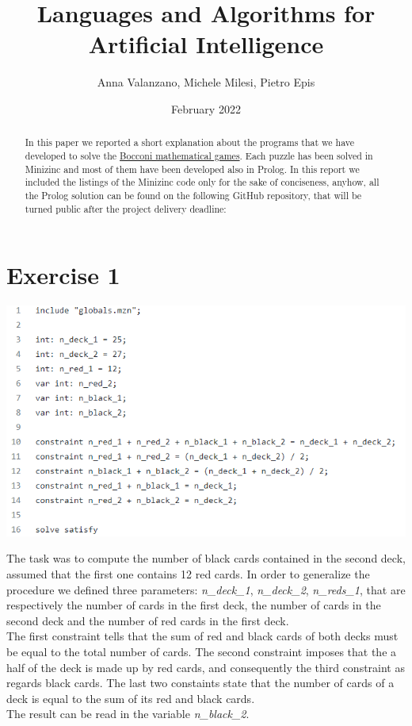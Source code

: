 \documentclass{article}
\title{Languages and Algorithms for Artificial Intelligence}
\date{February 2022}
\author{Anna Valanzano, Michele Milesi, Pietro Epis}
\begin{document}
\maketitle

\begin{abstract}
In this paper we reported a short explanation about the programs that we have developed to solve the \href{https://giochimatematici.unibocconi.it/index.php/gare/giochi-d-autunno/170-gli-allenamenti-ai-giochi-d-autunno}{Bocconi mathematical games}. 
Each puzzle has been solved in Minizinc and most of them have been developed also in Prolog.
In this report we included the listings of the Minizinc code only for the sake of conciseness, anyhow,
all the Prolog solution can be found on the following GitHub repository, that will be turned public after
the project delivery deadline: 

\end{abstract}

\section{Exercise 1}
\vspace{0.2cm}
\includegraphics[width=\linewidth]{img/Es1.png}
\vspace{0.2cm}

The task was to compute the number of black cards contained in the second deck, assumed that
the first one contains 12 red cards. In order to generalize the procedure we defined three parameters:
\textit{n\_deck\_1}, \textit{n\_deck\_2}, \textit{n\_reds\_1}, that are respectively the number of cards in
the first deck, the number of cards in the second deck and the number of red cards in the first deck.\\
The first constraint tells that the sum of red and black cards of both decks must be equal
to the total number of cards. The second constraint imposes that the a half of the deck is made
up by red cards, and consequently the third constraint as regards black cards.
The last two constaints state that the number of cards of a deck is equal to the sum of
its red and black cards.\\
The result can be read in the variable \textit{n\_black\_2}.
\end{document}
